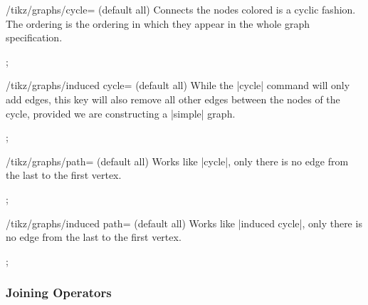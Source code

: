 \begin{key}{/tikz/graphs/cycle= (default all)}
    Connects the nodes colored  is a cyclic fashion. The ordering
    is the ordering in which they appear in the whole graph specification.
\begin{codeexample}[preamble={\usetikzlibrary{graphs}}]
\tikz {};
\end{codeexample}
\end{key}

\begin{key}{/tikz/graphs/induced cycle= (default all)}
    While the |cycle| command will only add edges, this key will also remove
    all other edges between the nodes of the cycle, provided we are
    constructing a |simple| graph.
\begin{codeexample}[preamble={\usetikzlibrary{graphs.standard}}]
\tikz {};
\end{codeexample}
\end{key}

\begin{key}{/tikz/graphs/path= (default all)}
    Works like |cycle|, only there is no edge from the last to the first
    vertex.
\begin{codeexample}[preamble={\usetikzlibrary{graphs}}]
\tikz {};
\end{codeexample}
\end{key}

\begin{key}{/tikz/graphs/induced path= (default all)}
    Works like |induced cycle|, only there is no edge from the last to the
    first vertex.
\begin{codeexample}[preamble={\usetikzlibrary{graphs.standard}}]
\tikz {};
\end{codeexample}
\end{key}


\subsubsection{Joining Operators}

